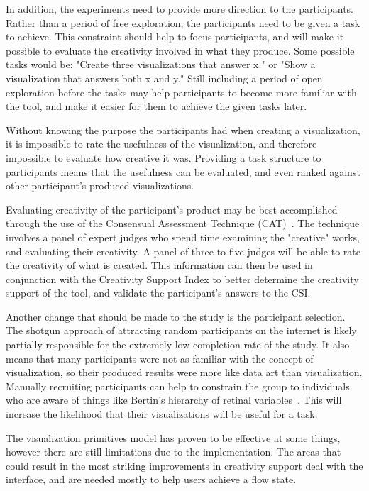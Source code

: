 In addition, the experiments need to provide more direction to the participants.
Rather than a period of free exploration, the participants need to be given a task to achieve.
This constraint should help to focus participants, and will make it possible to evaluate the creativity involved in what they produce. Some possible tasks would be: "Create three visualizations that answer x." or "Show a visualization that answers both x and y."
Still including a period of open exploration before the tasks may help participants to become more familiar with the tool, and make it easier for them to achieve the given tasks later.

Without knowing the purpose the participants had when creating a visualization, it is impossible to rate the usefulness of the visualization, and therefore impossible to evaluate how creative it was.
Providing a task structure to participants means that the usefulness can be evaluated, and even ranked against other participant's produced visualizations.

Evaluating creativity of the participant's product may be best accomplished through the use of the Consensual Assessment Technique (CAT)~\cite{Amabile1996}.
The technique involves a panel of expert judges who spend time examining the "creative" works, and evaluating their creativity.
A panel of three to five judges will be able to rate the creativity of what is created. This information can then be used in conjunction with the Creativity Support Index to better determine the creativity support of the tool, and validate the participant's answers to the CSI.

Another change that should be made to the study is the participant selection. The shotgun approach of attracting random participants on the internet is likely partially responsible for the extremely low completion rate of the study. It also means that many participants were not as familiar with the concept of visualization, so their produced results were more like data art than visualization. Manually recruiting participants can help to constrain the group to individuals who are aware of things like Bertin's hierarchy of retinal variables~\cite{bertin1983semiology}. This will increase the likelihood that their visualizations will be useful for a task.

\label{interfaceImprovements}
The visualization primitives model has proven to be effective at some things, however there are still limitations due to the implementation.
The areas that could result in the most striking improvements in creativity support deal with the interface, and are needed mostly to help users achieve a flow state.

